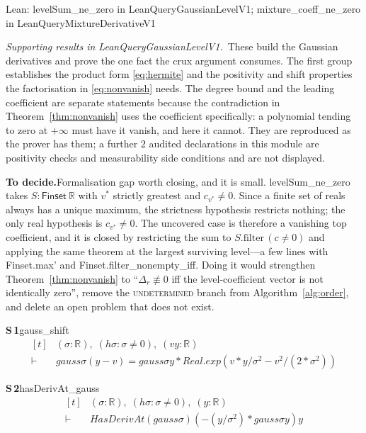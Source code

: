 \documentclass[conference]{IEEEtran}
\theoremstyle{definition}
\newcommand{\lean}[1]{\textsf{\footnotesize #1}}
\newcommand{\leanbox}[1]{%
  \par\vspace{2pt}\noindent
  {\footnotesize\textsf{Lean: #1}}\par\vspace{2pt}}
\newif\ifshownotes\shownotestrue
\newcommand{\TODOPAR}[1]{\ifshownotes\par\vspace{2pt}\noindent%
  {\color{todocol}\textsf{\footnotesize\textbf{To decide.}\;#1}}\par\vspace{2pt}\fi}
\begin{document}
\leanbox{\lean{levelSum\_ne\_zero} in \lean{LeanQueryGaussianLevelV1};
\lean{mixture\_coeff\_ne\_zero} in \lean{LeanQueryMixtureDerivativeV1}}

\noindent\emph{Supporting results in \lean{LeanQueryGaussianLevelV1}.}~These build the Gaussian derivatives and prove the one fact the crux argument consumes. The first group establishes the product form \eqref{eq:hermite} and the positivity and shift properties the factorisation in \eqref{eq:nonvanish} needs. The degree bound and the leading coefficient are separate statements because the contradiction in Theorem~\ref{thm:nonvanish} uses the coefficient specifically: a polynomial tending to zero at $+\infty$ must have it vanish, and here it cannot. They are reproduced as the prover has them; a further $2$ audited declarations in this module are positivity checks and measurability side conditions and are not displayed.
\TODOPAR{Formalisation gap worth closing, and it is small. \lean{levelSum\_ne\_zero}
takes $S:\mathsf{Finset}\ \mathbb{R}$ with $v^{*}$ strictly greatest and $c_{v^{*}}\neq0$.
Since a finite set of reals always has a unique maximum, the strictness hypothesis restricts
nothing; the only real hypothesis is $c_{v^{*}}\neq0$. The uncovered case is therefore a
vanishing top coefficient, and it is closed by restricting the sum to
$S.\mathrm{filter}\,(c\neq0)$ and applying the same theorem at the largest surviving level---a
few lines with \lean{Finset.max'} and \lean{Finset.filter\_nonempty\_iff}. Doing it would
strengthen Theorem~\ref{thm:nonvanish} to ``$\Delta_{r}\not\equiv0$ iff the level-coefficient
vector is not identically zero'', remove the \textsc{undetermined} branch from
Algorithm~\ref{alg:order}, and delete an open problem that does not exist.}

\noindent\textbf{S\,1}\quad\lean{gauss\_shift}
{\footnotesize\[ \begin{aligned}[t]
&(\sigma : \mathbb{R} ),\; (\mathit{hσ} : \sigma \neq 0),\; (\mathit{v} \mathit{y} : \mathbb{R} )\\
\vdash\;&\mathit{gauss} \sigma (\mathit{y} - \mathit{v}) = \mathit{gauss} \sigma \mathit{y} * \mathit{Real}.\mathit{exp} (\mathit{v} * \mathit{y} / \sigma ^{2} - \mathit{v} ^{2} / (2 * \sigma ^{2}))
\end{aligned} \]}

\noindent\textbf{S\,2}\quad\lean{hasDerivAt\_gauss}
{\footnotesize\[ \begin{aligned}[t]
&(\sigma : \mathbb{R} ),\; (\mathit{hσ} : \sigma \neq 0),\; (\mathit{y} : \mathbb{R} )\\
\vdash\;&\mathit{HasDerivAt} (\mathit{gauss} \sigma ) (-(\mathit{y} / \sigma ^{2}) * \mathit{gauss} \sigma \mathit{y}) \mathit{y}
\end{aligned} \]}
\end{document}
